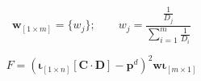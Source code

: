 \begin{equation}\label{eq:weights}
  \bm{w}_{\left[1\times m\right]}= \{w_j\}; \qquad   w_j=\frac{\frac{1}{D_j}}{\sum_{i=1}^m\frac{1}{D_i}}
\end{equation}


\begin{equation}\label{eq:objfct-nelson}
	F=\left( \bm{\iota}_{\left[1 \times n\right]}\left[\bm{C}\cdot\bm{D}\right] - 		\bm{p}^d\right)^2 \bm{w}\bm{\iota}_{\left[m \times 1\right]}
\end{equation}





